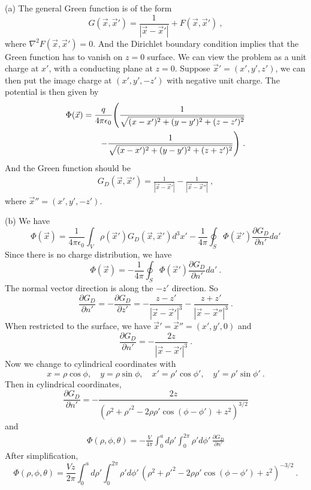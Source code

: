 \documentclass[12pt]{article}
\begin{document}
\newpage
{} (a) The general Green function is of the form
\begin{equation}
    G(\vec x, \vec x') = \frac{1}{|\vec x - \vec x'|} + F(\vec x, \vec x')~,
\end{equation}
where $\nabla^2 F(\vec x, \vec x') = 0$. And the Dirichlet boundary condition implies that the Green function has to vanish on $z = 0$ surface. We can view the problem as a unit charge at $x'$, with a conducting plane at $z = 0$. Suppose $\vec x' = (x', y', z')$, we can then put the image charge at $(x',y',-z')$ with negative unit charge. The potential is then given by
\begin{align}
    \Phi(\vec x) = \frac{q}{4\pi \epsilon_0} \Bigg(\frac{1}{\sqrt{(x-x')^2 + (y-y')^2 + (z-z')^2}} \cr
    - \frac{1}{\sqrt{(x-x')^2 + (y-y')^2 + (z+z')^2}}\Bigg)~.
\end{align}
And the Green function should be
\begin{align}
    G_D(\vec x, \vec x') =  \frac{1}{|\vec x - \vec x'|} - \frac{1}{|\vec x - \vec x''|}~,
\end{align}
where $\vec x'' = (x', y', -z')$.

\newpage
{} (b) We have
\begin{equation}
    \Phi(\vec x) = \frac{1}{4\pi \epsilon_0} \int_V \rho(\vec x') G_D(\vec x, \vec x') d^3 x' - \frac{1}{4\pi} \oint_S \Phi(\vec x') \frac{\partial G_D}{\partial n'} da'
\end{equation}
Since there is no charge distribution, we have
\begin{equation}
    \Phi(\vec x) = - \frac{1}{4\pi} \oint_S \Phi(\vec x') \frac{\partial G_D}{\partial n'} da'~.
\end{equation}
The normal vector direction is along the $-z'$ direction. So
\begin{equation}
    \frac{\partial G_D}{\partial n'} = - \frac{\partial G_D}{\partial z'} = -\frac{z-z'}{|\vec x - \vec x'|^3} - \frac{z + z'}{|\vec x - \vec x''|^3}~.
\end{equation}
When restricted to the surface, we have $\vec x' = \vec x'' = (x', y', 0)$ and
\begin{equation}
    \frac{\partial G_D}{\partial n'} = - \frac{2 z}{|\vec x - \vec x'|^3}~.
\end{equation}
Now we change to cylindrical coordinates with
$$
x = \rho \cos \phi, \quad y = \rho \sin \phi, \quad x' = \rho' \cos \phi', \quad y' = \rho' \sin \phi'~.
$$
Then in cylindrical coordinates,
\begin{equation}
    \frac{\partial G_D}{\partial n'} = -\frac{2z}{(\rho^2 + \rho'^2 - 2\rho \rho' \cos(\phi - \phi') + z^2)^{3/2}}
\end{equation}
and
\begin{align}
    \Phi(\rho, \phi, \theta) = - \frac{V}{4\pi} \int_0^a d\rho' \int_0^{2\pi} \rho' d \phi' \, \frac{\partial G_D}{\partial n'}
\end{align}
After simplification,
\begin{equation} \label{eqn:phi}
    \Phi(\rho, \phi, \theta) =  \frac{Vz}{2\pi} \int_0^a d\rho' \int_0^{2\pi} \rho' d \phi' \, (\rho ^2 + \rho'^2 - 2\rho \rho' \cos(\phi - \phi') + z^2)^{-3/2}~.
\end{equation}
\end{document}
